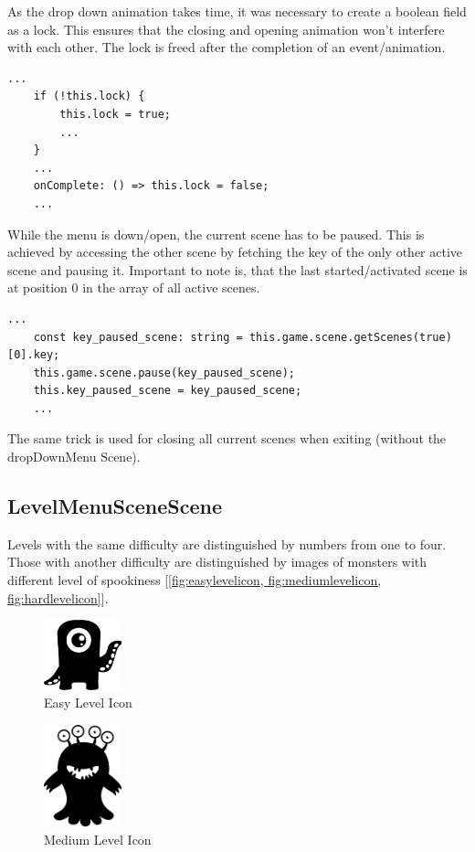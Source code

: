 As the drop down animation takes time, it was necessary to create a boolean field as a lock.
This ensures that the closing and opening animation won't interfere with each other.
The lock is freed after the completion of an event/animation.

\begin{lstlisting}[style=TypeScript, caption={Lock aquiring and freeing}]
    ...
    if (!this.lock) {
        this.lock = true;
        ...
    }
    ...
    onComplete: () => this.lock = false;
    ...
\end{lstlisting}

While the menu is down/open, the current scene has to be paused.
This is achieved by accessing the other scene by fetching the key of the only other active scene and pausing it.
Important to note is, that the last started/activated scene is at position 0 in the array of all active scenes.
\begin{lstlisting}[style=TypeScript, caption={Fetching current active scene}]
    ...
    const key_paused_scene: string = this.game.scene.getScenes(true)[0].key;
    this.game.scene.pause(key_paused_scene);
    this.key_paused_scene = key_paused_scene;
    ...
\end{lstlisting}

The same trick is used for closing all current scenes when exiting (without the dropDownMenu Scene).

\subsection{LevelMenuSceneScene}\label{subsec:levelmenuscenescene}
Levels with the same difficulty are distinguished by numbers from one to four.
Those with another difficulty are distinguished by images of monsters with different level of spookiness
[\ref{fig:easylevelicon, fig:mediumlevelicon, fig:hardlevelicon}].

\begin{figure}[H]
    \centering
    \includegraphics[width=0.2\textwidth]{figures/easylevelicon}
    \caption{Easy Level Icon}
    \label{fig:easylevelicon}
\end{figure}

\begin{figure}[H]
    \centering
    \includegraphics[width=0.2\textwidth]{figures/mediumlevelicon}
    \caption{Medium Level Icon}
    \label{fig:mediumlevelicon}
\end{figure}

